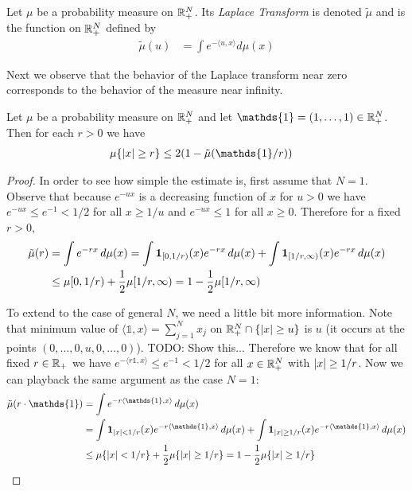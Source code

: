 \begin{defn}Let $\mu$ be a probability measure on $\mathbb{R}^N_+$. Its
  \emph{Laplace Transform} is denoted $\tilde{\mu}$ and is the function on
  $\mathbb{R}^N_+$ defined by 
\begin{align*}
\tilde{\mu}(u) &= \int e^{-\langle u,x \rangle} d \mu(x)
\end{align*}
\end{defn}

Next we observe that the behavior of the Laplace transform near zero
corresponds to the behavior of the measure near infinity.
\begin{lem}\label{LaplaceTailEstimate}Let $\mu$ be a probability
  measure on $\mathbb{R}^N_+$ and let $\mathds{1}=(1, \dotsc, 1) \in
  \reals^N_+$.  Then for each $r > 0$ we have
\begin{align*}
\mu\lbrace \abs{x} \geq r\rbrace &\leq 2(1 - \tilde{\mu}(\mathds{1}/r))
\end{align*}
\end{lem}
\begin{proof}
In order to see how simple the estimate is, first assume that $N=1$.
Observe that because $e^{-ux}$ is a decreasing function of $x$ for $u
> 0$ we have $e^{-ux}  \leq e^{-1} < 1/2$ for all $x
\geq 1/u$ and $e^{-ux} \leq 1$ for all $x \geq 0$.  Therefore for a fixed $r > 0$,
\begin{align*}
\tilde{\mu}(r) &= \int e^{-rx} \, d\mu(x) = \int \textbf{1}_{[0,1/r)}(x)  e^{-rx}
\, d\mu(x)  + \int \textbf{1}_{[1/r,\infty)}(x)  e^{-rx} \,
d\mu(x)  \\
&\leq \mu[0,1/r) + \frac{1}{2} \mu[1/r, \infty) = 1 - \frac{1}{2} \mu[1/r, \infty) 
\end{align*}

To extend to the case of general $N$, we need a little bit more
information.  Note that minimum value of
$\langle \mathds{1}, x\rangle = \sum_{j=1}^N x_j$ on $\mathbb{R}^N_+ \cap \lbrace \left \vert x \right \vert \geq u \rbrace$ is
$u$ (it occurs at the points $(0, \dotsc, 0,u,0, \dotsc,0)$).  TODO:
Show this...
Therefore we know that for all fixed $r \in \mathbb{R}_+$ we have $e^{-\langle r
\mathds{1}, x \rangle} \leq e^{-1} < 1/2$ for all $x \in \mathbb{R}^N_+$
with $\left \vert x \right \vert \geq 1/r$.  Now we can playback the same argument as the
case $N=1$:
\begin{align*}
\tilde{\mu}(r \cdot \mathds{1}) &= \int e^{-r\langle \mathds{1}, x \rangle}
\, d\mu(x) \\
&= \int \characteristic{\abs{x} < 1/r}(x)  e^{-r\langle \mathds{1}, x \rangle}
\, d\mu(x)  + \int \characteristic{\abs{x} \geq 1/r}(x)  e^{-r\langle \mathds{1}, x \rangle} \,
d\mu(x)  \\
&\leq \mu \lbrace \abs{x} < 1/r \rbrace + \frac{1}{2} \mu \lbrace
\abs{x} \geq 1/r \rbrace = 1 - \frac{1}{2} \mu \lbrace \abs{x} \geq
1/r \rbrace
\end{align*}
\end{proof}

